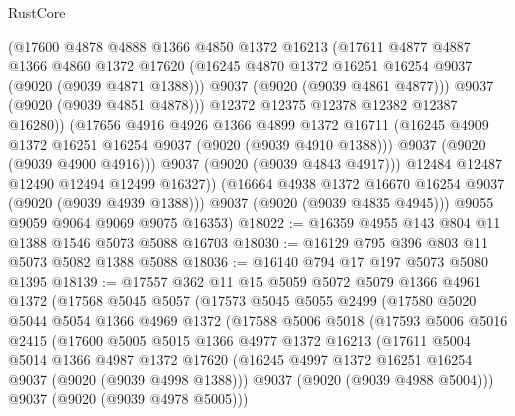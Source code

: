 \begin{lexlean}{RustCore}
\begin{coremodule}
                  (@17600
                    @4878
                    @4888
                    @1366
                    @4850
                    @1372
                    @16213
                    (@17611
                      @4877
                      @4887
                      @1366
                      @4860
                      @1372
                      @17620
                      (@16245 @4870 @1372 @16251 @16254 @9037 (@9020 (@9039 @4871 @1388)))
                      @9037
                      (@9020 (@9039 @4861 @4877)))
                    @9037
                    (@9020 (@9039 @4851 @4878)))
                  @12372
                  @12375
                  @12378
                  @12382
                  @12387
                  @16280))
              (@17656
                @4916
                @4926
                @1366
                @4899
                @1372
                @16711
                (@16245 @4909 @1372 @16251 @16254 @9037 (@9020 (@9039 @4910 @1388)))
                @9037
                (@9020 (@9039 @4900 @4916)))
              @9037
              (@9020 (@9039 @4843 @4917)))
            @12484
            @12487
            @12490
            @12494
            @12499
            @16327))
        (@16664 @4938 @1372 @16670 @16254 @9037 (@9020 (@9039 @4939 @1388)))
        @9037
        (@9020 (@9039 @4835 @4945)))
      @9055
      @9059
      @9064
      @9069
      @9075
      @16353)
@18022 := @16359 @4955 @143 @804 @11 @1388 @1546 @5073 @5088 @16703
@18030 := @16129 @795 @396 @803 @11 @5073 @5082 @1388 @5088
@18036 := @16140 @794 @17 @197 @5073 @5080 @1395
@18139 := @17557
    @362
    @11
    @15
    @5059
    @5072
    @5079
    @1366
    @4961
    @1372
    (@17568
      @5045
      @5057
      (@17573
        @5045
        @5055
        @2499
        (@17580
          @5020
          @5044
          @5054
          @1366
          @4969
          @1372
          (@17588
            @5006
            @5018
            (@17593
              @5006
              @5016
              @2415
              (@17600
                @5005
                @5015
                @1366
                @4977
                @1372
                @16213
                (@17611
                  @5004
                  @5014
                  @1366
                  @4987
                  @1372
                  @17620
                  (@16245 @4997 @1372 @16251 @16254 @9037 (@9020 (@9039 @4998 @1388)))
                  @9037
                  (@9020 (@9039 @4988 @5004)))
                @9037
                (@9020 (@9039 @4978 @5005)))

\end{coremodule}
\end{lexlean}
